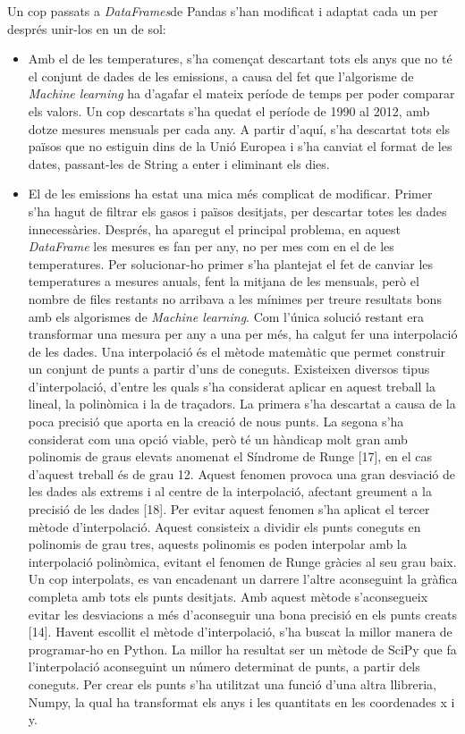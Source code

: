 \documentclass[10pt,a4paper,twocolumn,twoside]{article}
\begin{document}
Un cop passats a \textit{DataFrames}de Pandas s'han modificat i adaptat cada un per després unir-los en un de sol:
\begin{itemize}
\item Amb el de les temperatures, s'ha començat descartant tots els anys que no té el conjunt de dades de les emissions, a causa del fet que l'algorisme de  \textit{Machine learning} ha d'agafar el mateix període de temps per poder comparar els valors. Un cop descartats s'ha quedat el període de 1990 al 2012, amb dotze mesures mensuals per cada any. A partir d'aquí, s'ha descartat tots els països que no estiguin dins de la Unió Europea i s'ha canviat el format de les dates, passant-les de String a enter i eliminant els dies.
\item El de les emissions ha estat una mica més complicat de modificar. Primer s'ha hagut de filtrar els gasos i països desitjats, per descartar totes les dades innecessàries. Després, ha aparegut el principal problema, en aquest \textit{DataFrame} les mesures es fan per any, no per mes com en el de les temperatures. Per solucionar-ho primer s'ha plantejat el fet de canviar les temperatures a mesures anuals, fent la mitjana de les mensuals, però el nombre de files restants no arribava a les mínimes per treure resultats bons amb els algorismes de \textit{Machine learning}. Com l'única solució restant era transformar una mesura per any a una per més, ha calgut fer una interpolació de les dades.
Una interpolació és el mètode matemàtic que permet construir un conjunt de punts a partir d'uns de coneguts. Existeixen diversos tipus d'interpolació, d'entre les quals s'ha considerat aplicar en aquest treball la lineal, la polinòmica i la de traçadors. La primera s'ha descartat a causa de la poca precisió que aporta en la creació de nous punts. La segona s'ha considerat com una opció viable, però té un hàndicap molt gran amb polinomis de graus elevats anomenat el Síndrome de Runge [17], en el cas d'aquest treball és de grau 12. Aquest fenomen provoca una gran desviació de les dades als extrems i al centre de la interpolació, afectant greument a la precisió de les dades [18]. Per evitar aquest fenomen s'ha aplicat el tercer mètode d'interpolació. Aquest consisteix a dividir els punts coneguts en polinomis de grau tres, aquests polinomis es poden interpolar amb la interpolació polinòmica, evitant el fenomen de Runge gràcies al seu grau baix. Un cop interpolats, es van encadenant un darrere l'altre aconseguint la gràfica completa amb tots els punts desitjats. Amb aquest mètode s'aconsegueix evitar les desviacions a més d'aconseguir una bona precisió en els punts creats [14]. Havent escollit el mètode d'interpolació, s'ha buscat la millor manera de programar-ho en Python. La millor ha resultat ser un mètode de SciPy que fa l'interpolació aconseguint un número determinat de punts, a partir dels coneguts. Per crear els punts s'ha utilitzat una funció d'una altra llibreria, Numpy, la qual ha transformat els anys i les quantitats en les coordenades x i y.
\end{itemize}
\end{document}
